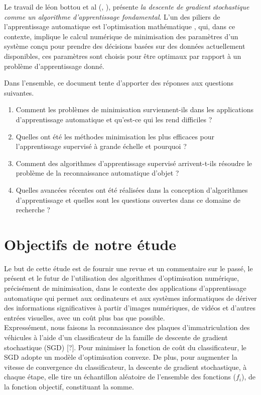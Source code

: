 		Le travail de  léon bottou et al (\eg, \cite{bottou2010large} \cite{wijnhoven2010fast} \cite{bottou2012stochastic} ), présente \textit{la descente de gradient stochastique comme un algorithme d'apprentissage fondamental}.
		L'un des piliers de l'apprentissage automatique est l'optimisation mathématique \cite[Jorge Nocedal dans][page: 3]{bottou2018optimization}, qui, dans ce contexte, implique le calcul numérique de minimisation des paramètres d'un système conçu pour prendre des décisions basées sur des données actuellement disponibles, ces paramètres sont choisis pour être optimaux par rapport à un problème d'apprentissage donné.
		
		Dans l'ensemble, ce document tente d'apporter des réponses aux questions suivantes.
		\begin{enumerate}
			\item Comment les problèmes de minimisation surviennent-ils dans les applications d'apprentissage automatique et qu'est-ce qui les rend difficiles ?
			\item Quelles ont été les méthodes minimisation les plus efficaces pour l'apprentissage supervisé à grande échelle et pourquoi ?
			\item Comment des algorithmes d'apprentissage supervisé arrivent-t-ils résoudre le problème de la reconnaissance automatique d'objet ?
			\item Quelles avancées récentes ont été réalisées dans la conception d'algorithmes d'apprentissage et quelles sont les questions ouvertes dans ce domaine de recherche ?
		\end{enumerate}
		
		
	
	\section{Objectifs de notre étude}
		
		Le but de cette étude est de fournir une revue et un commentaire sur le passé, le présent et le futur de l'utilisation des algorithmes d'optimisation numérique, précisément de minimisation, dans le contexte des applications d'apprentissage automatique qui permet aux ordinateurs et aux systèmes informatiques de dériver des informations significatives à partir d'images numériques, de vidéos et d'autres entrées visuelles, avec un coût plus bas que possible. \\
		
		Expressément, nous faisons la reconnaissance des plaques d’immatriculation des véhicules à l'aide d’un classificateur de la famille de descente de gradient stochastique (SGD) [?]. Pour minimiser la fonction de coût du classificateur, le SGD adopte un modèle d'optimisation convexe. De plus, pour augmenter la vitesse de convergence du classificateur, la descente de gradient stochastique, à chaque étape, elle tire un échantillon aléatoire de l'ensemble des fonctions ($f_i$), de la fonction objectif, constituant la somme.\\
		
